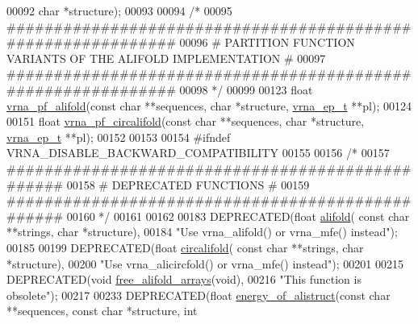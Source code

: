 \begin{DoxyCode}
00092                   \textcolor{keywordtype}{char} *structure);
00093 
00094 \textcolor{comment}{/*}
00095 \textcolor{comment}{#############################################################}
00096 \textcolor{comment}{# PARTITION FUNCTION VARIANTS OF THE ALIFOLD IMPLEMENTATION #}
00097 \textcolor{comment}{#############################################################}
00098 \textcolor{comment}{*/}
00099 
00123 \textcolor{keywordtype}{float} \hyperlink{group__consensus__pf__fold_ga374e31a0f326b2c5da5b84e143a63f38}{vrna\_pf\_alifold}(\textcolor{keyword}{const} \textcolor{keywordtype}{char} **sequences, \textcolor{keywordtype}{char} *structure, 
      \hyperlink{group__struct__utils_structvrna__elem__prob__s}{vrna\_ep\_t} **pl);
00124 
00151 \textcolor{keywordtype}{float} \hyperlink{group__consensus__pf__fold_gab70fe6c9a78b79cc5669881720926e1d}{vrna\_pf\_circalifold}(\textcolor{keyword}{const} \textcolor{keywordtype}{char} **sequences, \textcolor{keywordtype}{char} *structure, 
      \hyperlink{group__struct__utils_structvrna__elem__prob__s}{vrna\_ep\_t} **pl);
00152 
00153 
00154 \textcolor{preprocessor}{#ifndef VRNA\_DISABLE\_BACKWARD\_COMPATIBILITY}
00155 
00156 \textcolor{comment}{/*}
00157 \textcolor{comment}{#################################################}
00158 \textcolor{comment}{# DEPRECATED FUNCTIONS                          #}
00159 \textcolor{comment}{#################################################}
00160 \textcolor{comment}{*/}
00161 
00162 
00183 DEPRECATED(\textcolor{keywordtype}{float} \hyperlink{group__consensus__mfe__fold_ga4cf00f0659e5f0480335d69e797f05b1}{alifold}( \textcolor{keyword}{const} \textcolor{keywordtype}{char} **strings, \textcolor{keywordtype}{char} *structure),
00184           \textcolor{stringliteral}{"Use vrna\_alifold() or vrna\_mfe() instead"});
00185 
00199 DEPRECATED(\textcolor{keywordtype}{float} \hyperlink{group__consensus__mfe__fold_gadbd3b0b1c144cbfb4efe704b2b260f96}{circalifold}( \textcolor{keyword}{const} \textcolor{keywordtype}{char} **strings, \textcolor{keywordtype}{char} *structure),
00200           \textcolor{stringliteral}{"Use vrna\_alicircfold() or vrna\_mfe() instead"});
00201 
00215 DEPRECATED(\textcolor{keywordtype}{void} \hyperlink{group__consensus__mfe__fold_ga72095e4554b5d577250ea14c42acc49e}{free\_alifold\_arrays}(\textcolor{keywordtype}{void}),
00216           \textcolor{stringliteral}{"This function is obsolete"});
00217 
00233 DEPRECATED(\textcolor{keywordtype}{float} \hyperlink{group__consensus__fold_ga1c48869c03b49a342bf4cbdd61900081}{energy\_of\_alistruct}(\textcolor{keyword}{const} \textcolor{keywordtype}{char} **sequences, \textcolor{keyword}{const} \textcolor{keywordtype}{char} *structure, \textcolor{keywordtype}{int} 

\end{DoxyCode}
